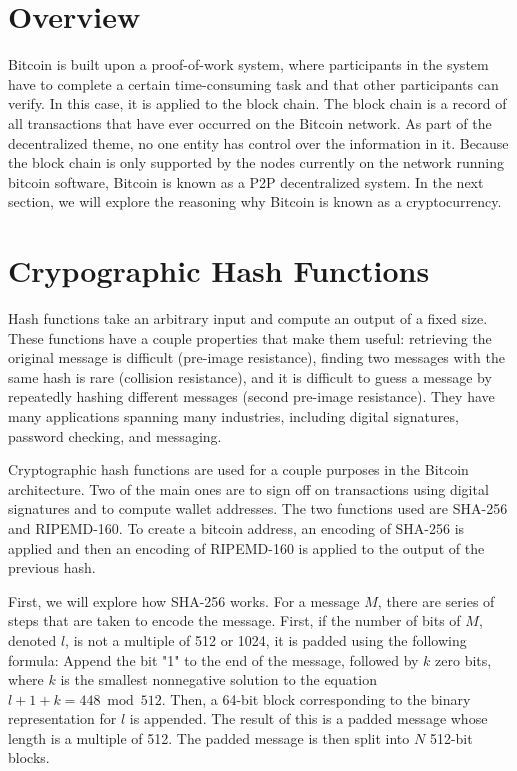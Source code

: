 \documentclass[12pt]{article}
\begin{document}
\section{Overview}
Bitcoin is built upon a proof-of-work system, where participants in the system have to complete a certain time-consuming task and that other participants can verify. In this case, it is applied to the block chain. The block chain is a record of all transactions that have ever occurred on the Bitcoin network. As part of the decentralized theme, no one entity has control over the information in it. Because the block chain is only supported by the nodes currently on the network running bitcoin software, Bitcoin is known as a P2P  decentralized system. In the next section, we will explore the reasoning why Bitcoin is known as a cryptocurrency.


\section{Crypographic Hash Functions}
Hash functions take an arbitrary input and compute an output of a fixed size. These functions have a couple properties that make them useful: retrieving the original message is difficult (pre-image resistance), finding two messages with the same hash is rare (collision resistance), and it is difficult to guess a message by repeatedly hashing different messages (second pre-image resistance). They have many applications spanning many industries, including digital signatures, password checking, and messaging.

Cryptographic hash functions are used for a couple purposes in the Bitcoin architecture. Two of the main ones are to sign off on transactions using digital signatures and to compute wallet addresses. The two functions used are SHA-256 and RIPEMD-160. To create a bitcoin address, an encoding of SHA-256 is applied and then an encoding of RIPEMD-160 is applied to the output of the previous hash.

First, we will explore how SHA-256 works. For a message $ M $, there are series of steps that are taken to encode the message. First, if the number of bits of $M$, denoted $l$, is not a multiple of 512 or 1024, it is padded using the following formula:
Append the bit "1" to the end of the message, followed by $k$ zero bits, where $k$ is the smallest nonnegative solution to the equation $l+1+k=448 \bmod 512 $. Then, a 64-bit block corresponding to the binary representation for $l$ is appended. The result of this is a padded message whose length is a multiple of 512. The padded message is then split into $N$ 512-bit blocks.
\end{document}
